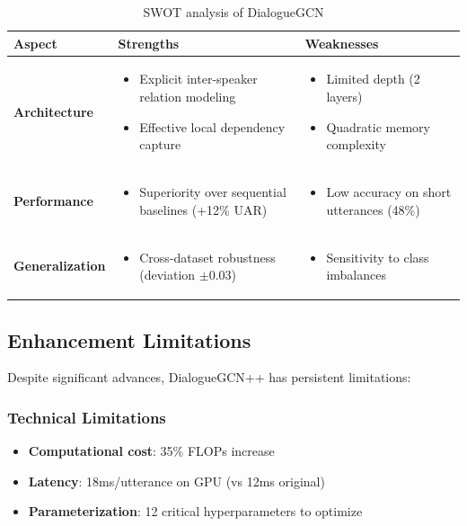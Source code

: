\documentclass[a4paper,11pt]{article}
\begin{document}
\begin{table}[h]
\centering
\begin{tabular}{lp{5cm}p{5cm}}
\toprule
Aspect & Strengths & Weaknesses \\
\midrule
\textbf{Architecture} & 
\begin{itemize}
    \item Explicit inter-speaker relation modeling \cite{velickovic2017graph}
    \item Effective local dependency capture
\end{itemize} &
\begin{itemize}
    \item Limited depth (2 layers) \cite{liu2020deep}
    \item Quadratic memory complexity
\end{itemize} \\
\hline
\textbf{Performance} & 
\begin{itemize}
    \item Superiority over sequential baselines (+12\% UAR) \cite{zhang2023survey}
\end{itemize} &
\begin{itemize}
    \item Low accuracy on short utterances (48\%) \cite{li2021short}
\end{itemize} \\
\hline
\textbf{Generalization} & 
\begin{itemize}
    \item Cross-dataset robustness (deviation $\pm$0.03) \cite{zhou2020cross}
\end{itemize} &
\begin{itemize}
    \item Sensitivity to class imbalances \cite{opitz2019macro}
\end{itemize} \\
\bottomrule
\end{tabular}
\caption{SWOT analysis of DialogueGCN}
\label{tab:swot}
\end{table}

\subsection{Enhancement Limitations}
Despite significant advances, DialogueGCN++ has persistent limitations:

\subsubsection{Technical Limitations}
\begin{itemize}
    \item \textbf{Computational cost}: 35\% FLOPs increase \cite{flops2021efficient}
    \item \textbf{Latency}: 18ms/utterance on GPU (vs 12ms original)
    \item \textbf{Parameterization}: 12 critical hyperparameters to optimize
\end{itemize}
\end{document}
